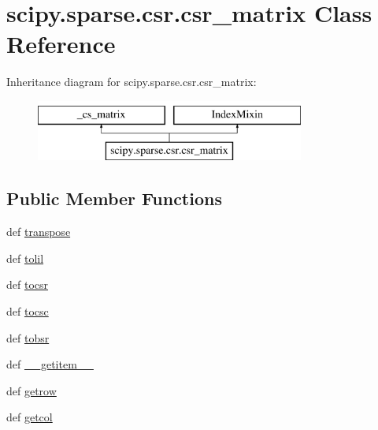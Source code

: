 \hypertarget{classscipy_1_1sparse_1_1csr_1_1csr__matrix}{}\section{scipy.\+sparse.\+csr.\+csr\+\_\+matrix Class Reference}
\label{classscipy_1_1sparse_1_1csr_1_1csr__matrix}
Inheritance diagram for scipy.\+sparse.\+csr.\+csr\+\_\+matrix\+:\begin{figure}[H]
\begin{center}
\leavevmode
\includegraphics[height=2.000000cm]{classscipy_1_1sparse_1_1csr_1_1csr__matrix}
\end{center}
\end{figure}
\subsection*{Public Member Functions}
\begin{DoxyCompactItemize}
\item 
def \hyperlink{classscipy_1_1sparse_1_1csr_1_1csr__matrix_a462bde29a77c1ab7f0b11b62d2669915}{transpose}
\item 
def \hyperlink{classscipy_1_1sparse_1_1csr_1_1csr__matrix_afe7149b5f7eb35685e776db23056934b}{tolil}
\item 
def \hyperlink{classscipy_1_1sparse_1_1csr_1_1csr__matrix_a3ade9184757d516edbad354727b6cfbc}{tocsr}
\item 
def \hyperlink{classscipy_1_1sparse_1_1csr_1_1csr__matrix_a0f28bae7a70344933f707857cbb310c8}{tocsc}
\item 
def \hyperlink{classscipy_1_1sparse_1_1csr_1_1csr__matrix_a6e0d92e065de333727d6de53954ca61d}{tobsr}
\item 
def \hyperlink{classscipy_1_1sparse_1_1csr_1_1csr__matrix_a8aeac1528502df67a53a8a1370600a46}{\+\_\+\+\_\+getitem\+\_\+\+\_\+}
\item 
def \hyperlink{classscipy_1_1sparse_1_1csr_1_1csr__matrix_a307b9bd552e929c010cca6e981cd778d}{getrow}
\item 
def \hyperlink{classscipy_1_1sparse_1_1csr_1_1csr__matrix_a6102bacba2d7bc55935242a0044d42df}{getcol}
\end{DoxyCompactItemize}


